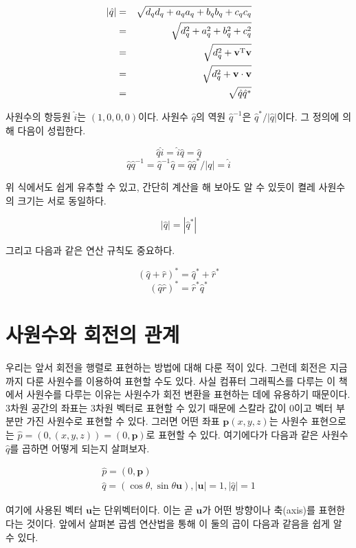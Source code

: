 \begin{eqnarray}
|\hat q| & = &\sqrt{d_q  d_q + a_q a_q + b_q b_q + c_q c_q} \\ \nonumber
& = & \sqrt{d_q^2 + a_q^2 + b_q^2 + c_q^2} \\ \nonumber
& = & \sqrt{d_q^2 + \mathbf v^{\rm T} \mathbf v} \\ \nonumber
& = & \sqrt{d_q^2 + \mathbf v \cdot \mathbf v} \\ \nonumber
& = & \sqrt{\hat q \hat q^*}
\end{eqnarray}

사원수의 항등원 $\hat i$는 $(1,0,0,0)$이다.
사원수 $\hat q$의 역원 $\hat q^{-1}$은 $\hat q^* / |\hat q|$이다.
그 정의에 의해 다음이 성립한다.

$$\hat q \hat i = \hat i \hat q = \hat q$$
$$\hat q \hat q^{-1} = \hat q^{-1} \hat q = \hat q \hat q^* / |q| = \hat i$$

위 식에서도 쉽게 유추할 수 있고, 간단히 계산을 해 보아도 알 수 있듯이 켤레 사원수의 크기는 서로 동일하다.

$$|\hat q| = |\hat q^*|$$

그리고 다음과 같은 연산 규칙도 중요하다.

$$(\hat q + \hat r)^* = \hat q^* + \hat r^*$$
$$(\hat q \hat r)^* = \hat r^* \hat q^*$$

\section{사원수와 회전의 관계}

우리는 앞서 회전을 행렬로 표현하는 방법에 대해 다룬 적이 있다.
그런데 회전은 지금까지 다룬 사원수를 이용하여 표현할 수도 있다.
사실 컴퓨터 그래픽스를 다루는 이 책에서 사원수를 다루는 이유는 사원수가 회전 변환을 표현하는 데에 유용하기 때문이다.
3차원 공간의 좌표는 3차원 벡터로 표현할 수 있기 때문에 스칼라 값이 0이고 벡터 부분만 가진 사원수로 표현할 수 있다.
그러면 어떤 좌표 ${\mathbf p}(x,y,z)$는 사원수 표현으로는 $\hat p=(0, (x,y,z))=(0, \mathbf p)$로 표현할 수 있다.
여기에다가 다음과 같은 사원수 $\hat q$를 곱하면 어떻게 되는지 살펴보자.

\begin{eqnarray}
\hat p = (0, \mathbf p) \\ \nonumber
\hat q = (\cos \theta, \sin \theta \mathbf u), |\mathbf u| = 1, |\hat q| = 1
\label{eq:quaternionsToBeMultiplied}
\end{eqnarray}

여기에 사용된 벡터 $\mathbf u$는 단위벡터이다. 이는 곧 $\mathbf u$가 어떤 방향이나 축(axis)를 표현한다는 것이다.
앞에서 살펴본 곱셈 연산법을 통해 이 둘의 곱이 다음과 같음을 쉽게 알 수 있다.

